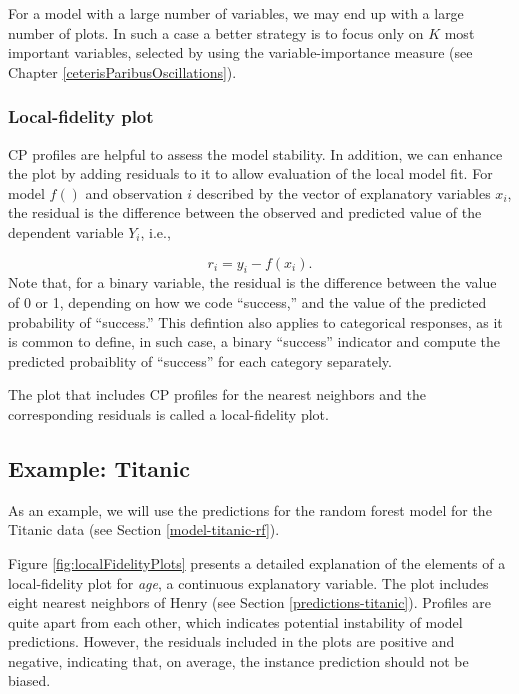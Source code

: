 \documentclass[12pt,]{krantz}
\begin{document}
For a model with a large number of variables, we may end up with a large number of plots. In such a case a better strategy is to focus only on \(K\) most important variables, selected by using the variable-importance measure (see Chapter \ref{ceterisParibusOscillations}).

\hypertarget{cPLocDiagLFplot}{%
\subsubsection{Local-fidelity plot}\label{cPLocDiagLFplot}}

CP profiles are helpful to assess the model stability. In addition, we can enhance the plot by adding residuals to it to allow evaluation of the local model fit. For model \(f()\) and observation \(i\) described by the vector of explanatory variables \(x_i\), the residual is the difference between the observed and predicted value of the dependent variable \(Y_i\), i.e.,

\[
r_i = y_i - f(x_i).
\]
Note that, for a binary variable, the residual is the difference between the value of 0 or 1, depending on how we code ``success,'' and the value of the predicted probability of ``success.'' This defintion also applies to categorical responses, as it is common to define, in such case, a binary ``success'' indicator and compute the predicted probaiblity of ``success'' for each category separately.

The plot that includes CP profiles for the nearest neighbors and the corresponding residuals is called a local-fidelity plot.

\hypertarget{cPLocDiagExample}{%
\subsection{Example: Titanic}\label{cPLocDiagExample}}

As an example, we will use the predictions for the random forest model for the Titanic data (see Section \ref{model-titanic-rf}).

Figure \ref{fig:localFidelityPlots} presents a detailed explanation of the elements of a local-fidelity plot for \emph{age}, a continuous explanatory variable. The plot includes eight nearest neighbors of Henry (see Section \ref{predictions-titanic}). Profiles are quite apart from each other, which indicates potential instability of model predictions. However, the residuals included in the plots are positive and negative, indicating that, on average, the instance prediction should not be biased.
\end{document}
